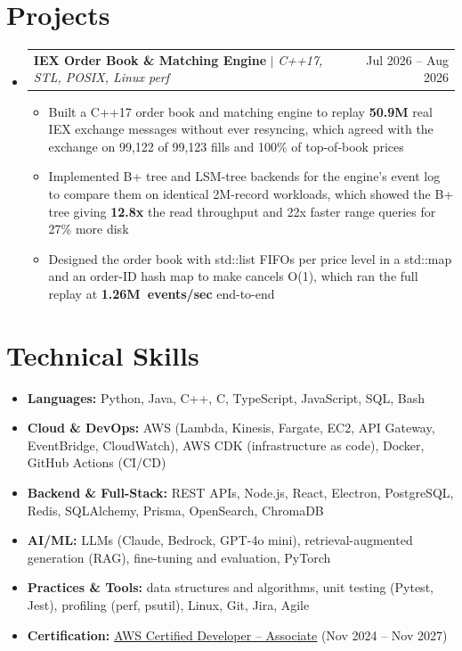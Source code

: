 \documentclass[letterpaper,10pt]{article}
\makeatletter
\newcommand{\resumeItem}[1]{\item{#1}\vspace{-1pt}}
\newcommand{\resumeProjectHeading}[2]{%
  \item
  \begin{tabular*}{\textwidth}{l@{\extracolsep{\fill}}r}
    #1 & #2 \\
  \end{tabular*}\vspace{-6pt}%
}
\newcommand{\resumeSubHeadingListStart}{\begin{itemize}[leftmargin=0in, label={}, itemsep=0pt, topsep=2pt]}
\newcommand{\resumeSubHeadingListEnd}{\end{itemize}}
\newcommand{\resumeItemListStart}{\begin{itemize}[leftmargin=0.18in, itemsep=0pt, topsep=1pt, parsep=0pt]}
\newcommand{\resumeItemListEnd}{\end{itemize}\vspace{0pt}}
\makeatother
\begin{document}
\section{Projects}
\resumeSubHeadingListStart
  \resumeProjectHeading
    {\textbf{IEX Order Book \& Matching Engine} $|$ \textit{C++17, STL, POSIX, Linux perf}}{Jul 2026 -- Aug 2026}
  \resumeItemListStart
    \resumeItem{Built a C++17 order book and matching engine to replay \textbf{50.9M} real IEX exchange messages without ever resyncing, which agreed with the exchange on 99,122 of 99,123 fills and 100\% of top-of-book prices}
    \resumeItem{Implemented B+ tree and LSM-tree backends for the engine's event log to compare them on identical 2M-record workloads, which showed the B+ tree giving \textbf{12.8x} the read throughput and 22x faster range queries for 27\% more disk}
    \resumeItem{Designed the order book with std::list FIFOs per price level in a std::map and an order-ID hash map to make cancels O(1), which ran the full replay at \mbox{\textbf{1.26M events/sec}} end-to-end}
  \resumeItemListEnd
\resumeSubHeadingListEnd

\section{Technical Skills}
\begin{itemize}[leftmargin=0in, label={}, itemsep=0pt, topsep=2pt]
  \small
  \item{\textbf{Languages:} Python, Java, C++, C, TypeScript, JavaScript, SQL, Bash}
  \item{\textbf{Cloud \& DevOps:} AWS (Lambda, Kinesis, Fargate, EC2, API Gateway, EventBridge, CloudWatch), AWS CDK (infrastructure as code), Docker, GitHub Actions (CI/CD)}
  \item{\textbf{Backend \& Full-Stack:} REST APIs, Node.js, React, Electron, PostgreSQL, Redis, SQLAlchemy, Prisma, OpenSearch, ChromaDB}
  \item{\textbf{AI/ML:} LLMs (Claude, Bedrock, GPT-4o mini), retrieval-augmented generation (RAG), fine-tuning and evaluation, PyTorch}
  \item{\textbf{Practices \& Tools:} data structures and algorithms, unit testing (Pytest, Jest), profiling (perf, psutil), Linux, Git, Jira, Agile}
  \item{\textbf{Certification:} \href{https://www.credly.com/badges/d2406a97-d937-47de-823b-724981159d3b/public_url}{\underline{AWS Certified Developer -- Associate}} (Nov 2024 -- Nov 2027)}
\end{itemize}
\end{document}
